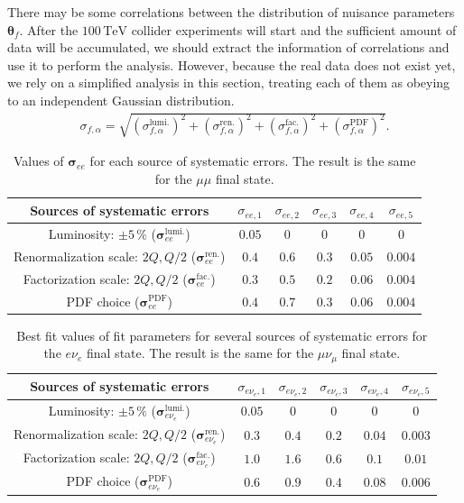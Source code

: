 \documentclass[12pt,twoside,book]{article}
\begin{document}
{
  There may be some correlations between the distribution of nuisance parameters $\bm{\theta}_{f}$.
  After the $100\,\mathrm{TeV}$ collider experiments will start and the sufficient amount of data will be accumulated, we should extract the information of correlations and use it to perform the analysis.
  However, because the real data does not exist yet, we rely on a simplified analysis in this section, treating each of them as obeying to an independent Gaussian distribution.
}
\begin{align}
  \sigma_{f,\alpha} = \sqrt{(\sigma_{f,\alpha}^{\mathrm{lumi.}})^2
  + (\sigma_{f,\alpha}^{\mathrm{ren.}})^2
  + (\sigma_{f,\alpha}^{\mathrm{fac.}})^2
  + (\sigma_{f,\alpha}^{\mathrm{PDF}})^2}.
  \label{eq_comb_sig}
\end{align}

\begin{table}[t]
  \centering
  \begin{tabular}{c|ccccc}
    Sources of systematic errors & $\sigma_{ee,1}$ & $\sigma_{ee,2}$ & $\sigma_{ee,3}$ & $\sigma_{ee,4}$ & $\sigma_{ee,5}$ \\ \hline
    Luminosity: $\pm 5\,\%$ ($\bm{\sigma}_{ee}^{\mathrm{lumi.}}$) & $0.05$ & $0$ & $0$ & $0$ & $0$ \\
    Renormalization scale: $2Q, Q/2$ ($\bm{\sigma}_{ee}^{\mathrm{ren.}}$) & $0.4$ & $0.6$ & $0.3$ & $0.05$ & $0.004$ \\
    Factorization scale: $2Q, Q/2$ ($\bm{\sigma}_{ee}^{\mathrm{fac.}}$) & $0.3$ & $0.5$ & $0.2$ & $0.06$ & $0.004$ \\
    PDF choice ($\bm{\sigma}_{ee}^{\mathrm{PDF}}$) & $0.4$ & $0.7$ & $0.3$ & $0.06$ & $0.004$
  \end{tabular}
  \caption{
    Values of $\bm{\sigma}_{ee}$ for each source of systematic errors.
    The result is the same for the $\mu\mu$ final state.
  }
  \label{tab_sys_ee}
\end{table}

\begin{table}[t]
  \centering
  \begin{tabular}{c|ccccc}
    Sources of systematic errors & $\sigma_{e \nu_e,1}$ & $\sigma_{e \nu_e,2}$ & $\sigma_{e \nu_e,3}$ & $\sigma_{e \nu_e,4}$ & $\sigma_{e \nu_e,5}$ \\ \hline
    Luminosity: $\pm 5\,\%$ ($\bm{\sigma}_{e \nu_e}^{\mathrm{lumi.}}$) & $0.05$ & $0$ & $0$ & $0$ & $0$ \\
    Renormalization scale: $2Q, Q/2$ ($\bm{\sigma}_{e \nu_e}^{\mathrm{ren.}}$) & $0.3$ & $0.4$ & $0.2$ & $0.04$ & $0.003$ \\
    Factorization scale: $2Q, Q/2$ ($\bm{\sigma}_{e \nu_e}^{\mathrm{fac.}}$) & $1.0$ & $1.6$ & $0.6$ & $0.1$ & $0.01$ \\
    PDF choice ($\bm{\sigma}_{e \nu_e}^{\mathrm{PDF}}$) & $0.6$ & $0.9$ & $0.4$ & $0.08$ & $0.006$
  \end{tabular}
  \caption{
    Best fit values of fit parameters for several sources of systematic errors for the $e\nu_e$ final state.
    The result is the same for the $\mu\nu_\mu$ final state.
  }
  \label{tab_sys_ev}
\end{table}
\end{document}
